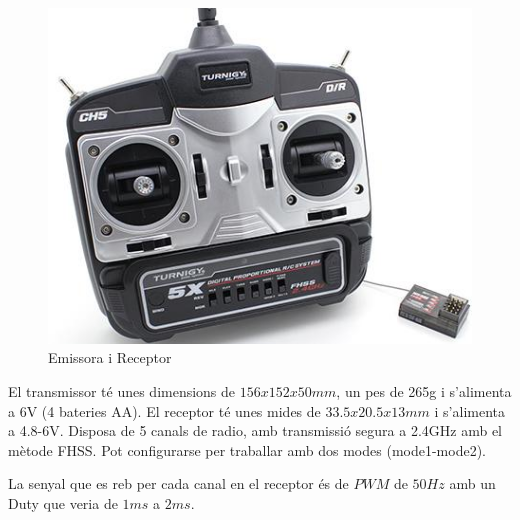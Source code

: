 \documentclass[twoside]{article}
\begin{document}
\begin{figure}[h!]
\begin{center}
\includegraphics[scale=0.4]{images/E_R.jpg} 
\caption{Emissora i Receptor}
\end{center}
\end{figure}

El transmissor té unes dimensions de $156x152x50mm$, un pes de 265g i s'alimenta a 6V (4 bateries AA). El receptor té unes mides de $33.5x20.5x13mm$ i s'alimenta a 4.8-6V. Disposa de 5 canals de radio, amb transmissió segura a 2.4GHz amb el mètode FHSS. Pot configurarse per traballar amb dos modes (mode1-mode2).

La senyal que es reb per cada canal en el receptor és de $PWM$ de $50Hz$ amb un Duty que veria de $1ms$ a $2ms$.

\end{document}
